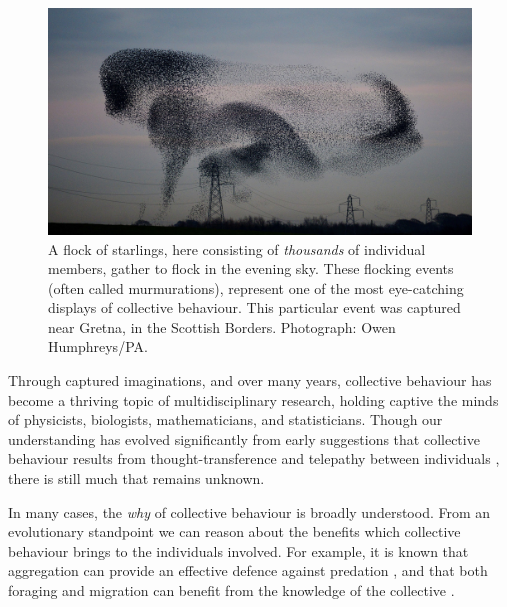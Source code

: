 \begin{figure}[t]
  \includegraphics[width=\textwidth]{murmuration.jpg}
  \caption{A flock of starlings, here consisting of \emph{thousands} of
    individual members, gather to flock in the evening sky. These flocking
    events (often called murmurations), represent one of the most
    eye-catching displays of collective behaviour. This particular event
    was captured near Gretna, in the Scottish Borders. Photograph: Owen
    Humphreys/PA.}
  \label{fig:murmuration}
\end{figure}

Through captured imaginations, and over many years, collective behaviour has
become a thriving topic of multidisciplinary research, holding captive the
minds of physicists, biologists, mathematicians, and statisticians. Though our
understanding has evolved significantly from early suggestions that collective
behaviour results from thought-transference and telepathy between individuals
\parencite{selous31}, there is still much that remains unknown.

In many cases, the \emph{why} of collective behaviour is broadly understood.
From an evolutionary standpoint we can reason about the benefits which
collective behaviour brings to the individuals involved. For example, it is
known that aggregation can provide an effective defence against predation
\parencite{landeau86}, and that both foraging and migration can benefit from
the knowledge of the collective \parencite{simmons04}.


